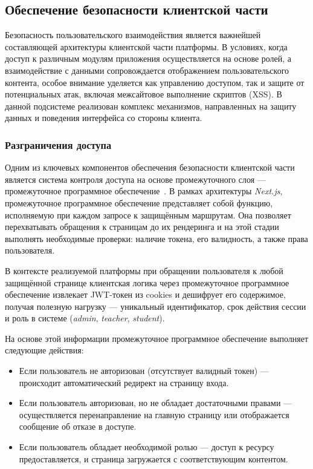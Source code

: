 \subsection{Обеспечение безопасности клиентской части}

Безопасность пользовательского взаимодействия является важнейшей составляющей архитектуры клиентской части платформы. В условиях, когда доступ к различным модулям приложения осуществляется на основе ролей, а взаимодействие с данными сопровождается отображением пользовательского контента, особое внимание уделяется как управлению доступом, так и защите от потенциальных атак, включая межсайтовое выполнение скриптов (XSS). В данной подсистеме реализован комплекс механизмов, направленных на защиту данных и поведения интерфейса со стороны клиента.

\subsubsection{Разграничения доступа}
Одним из ключевых компонентов обеспечения безопасности клиентской части является система контроля доступа на основе промежуточного слоя — промежуточное программное обеспечение~\cite{nextjs_middleware}. В рамках архитектуры \textit{Next.js}, промежуточное программное обеспечение представляет собой функцию, исполняемую при каждом запросе к защищённым маршрутам. Она позволяет перехватывать обращения к страницам до их рендеринга и на этой стадии выполнять необходимые проверки: наличие токена, его валидность, а также права пользователя.

В контексте реализуемой платформы при обращении пользователя к любой защищённой странице клиентская логика через промежуточное программное обеспечение извлекает JWT-токен из cookies и дешифрует его содержимое, получая полезную нагрузку — уникальный идентификатор, срок действия сессии и роль в системе (\textit{admin}, \textit{teacher}, \textit{student}).

На основе этой информации промежуточное программное обеспечение выполняет следующие действия:
\begin{itemize}
  \item Если пользователь не авторизован (отсутствует валидный токен) — происходит автоматический редирект на страницу входа.
  \item Если пользователь авторизован, но не обладает достаточными правами — осуществляется перенаправление на главную страницу или отображается сообщение об отказе в доступе.
  \item Если пользователь обладает необходимой ролью — доступ к ресурсу предоставляется, и страница загружается с соответствующим контентом.
\end{itemize}

